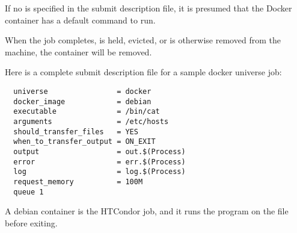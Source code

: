 If no  is specified in the submit description file,
it is presumed that the Docker container has a default command to run.

When the job completes, is held, evicted, 
or is otherwise removed from the machine, the container will be removed.

Here is a complete submit description file for a sample docker universe job:
\begin{verbatim}
  universe                = docker
  docker_image            = debian
  executable              = /bin/cat
  arguments               = /etc/hosts
  should_transfer_files   = YES
  when_to_transfer_output = ON_EXIT
  output                  = out.$(Process)
  error                   = err.$(Process)
  log                     = log.$(Process)
  request_memory          = 100M
  queue 1
\end{verbatim}

A debian container is the HTCondor job,
and it runs the  program on the  file
before exiting.


